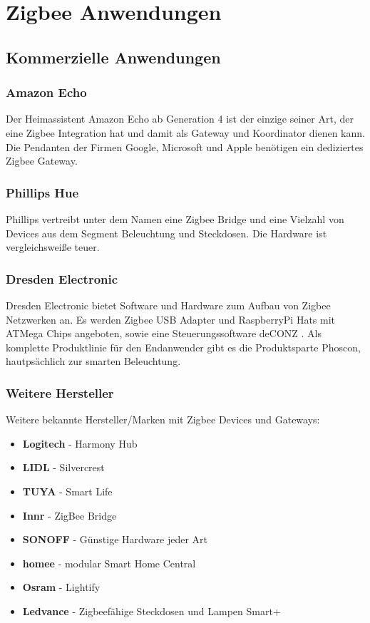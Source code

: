 \section{Zigbee Anwendungen}

\subsection{Kommerzielle Anwendungen}

\subsubsection{Amazon Echo}
    Der Heimassistent Amazon Echo ab Generation 4 ist der einzige seiner Art, der eine Zigbee Integration hat und damit als Gateway und Koordinator dienen
    kann. Die Pendanten der Firmen Google, Microsoft und Apple benötigen ein dediziertes Zigbee Gateway.

\subsubsection{Phillips Hue}
    Phillips vertreibt unter dem Namen eine Zigbee Bridge und eine Vielzahl von Devices aus dem Segment Beleuchtung und Steckdosen. Die Hardware ist vergleichsweiße
    teuer.

\subsubsection{Dresden Electronic}
    Dresden Electronic bietet Software und Hardware zum Aufbau von Zigbee Netzwerken an. Es werden Zigbee USB Adapter und RaspberryPi Hats mit ATMega Chips angeboten,
    sowie eine Steuerungssoftware \grqq deCONZ \grqq{}. Als komplette Produktlinie für den Endanwender gibt es die Produktsparte
    \grqq Phoscon\grqq{}, hautpsächlich zur smarten Beleuchtung.

\subsubsection*{Weitere Hersteller}
Weitere bekannte Hersteller/Marken mit Zigbee Devices und Gateways:
\begin{itemize}
    \item \textbf{Logitech} - Harmony Hub
    \item \textbf{LIDL} - Silvercrest
    \item \textbf{TUYA} - Smart Life
    \item \textbf{Innr} - ZigBee Bridge
    \item \textbf{SONOFF} - Günstige Hardware jeder Art
    \item \textbf{homee} -  modular Smart Home Central
    \item \textbf{Osram} - Lightify
    \item \textbf{Ledvance} - Zigbeefähige Steckdosen und Lampen \grqq Smart+ \grqq{}
\end{itemize}

